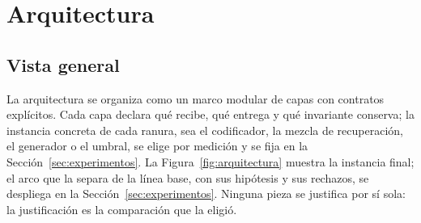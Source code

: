 \section{Arquitectura}
\label{sec:arquitectura}

\subsection{Vista general}

La arquitectura se organiza como un marco modular de capas con contratos expl\'icitos. Cada capa declara qu\'e recibe, qu\'e entrega y qu\'e invariante conserva; la instancia concreta de cada ranura, sea el codificador, la mezcla de recuperaci\'on, el generador o el umbral, se elige por medici\'on y se fija en la Secci\'on~\ref{sec:experimentos}. La Figura~\ref{fig:arquitectura} muestra la instancia final; el arco que la separa de la l\'inea base, con sus hip\'otesis y sus rechazos, se despliega en la Secci\'on~\ref{sec:experimentos}. Ninguna pieza se justifica por s\'i sola: la justificaci\'on es la comparaci\'on que la eligi\'o.

